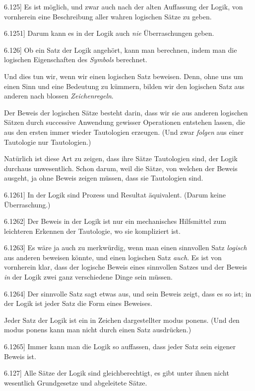 \documentclass[12pt,oneside]{book}[2007/10/19]
\newcommand{\PropERef}[1]{\hyperref[PropE:#1]{#1}}
\newcommand{\PropositionG}[2]{%
  \item[\phantomsection\label{PropG:#1}\PropERef{#1}] #2%
}
\newcommand{\Emph}[1]{\emph{#1}}%
\begin{document}
\begin{propositions}
\PropositionG{6.125}
{Es ist möglich, und zwar auch nach der alten
Auffassung der Logik, von vornherein eine Beschreibung
aller \glqq{}wahren\grqq{} logischen Sätze zu geben.}


\PropositionG{6.1251}
{Darum kann es in der Logik auch \Emph{nie} Überraschungen
geben.}


\PropositionG{6.126}
{Ob ein Satz der Logik angehört, kann man
berechnen, indem man die logischen Eigenschaften
des \Emph{Symbols} berechnet.

Und dies tun wir, wenn wir einen logischen
Satz \glqq{}beweisen\grqq{}. Denn, ohne uns um einen Sinn
und eine Bedeutung zu kümmern, bilden wir den
logischen Satz aus anderen nach blossen \Emph{Zeichenregeln}.

Der Beweis der logischen Sätze besteht darin,
dass wir sie aus anderen logischen Sätzen durch
successive Anwendung gewisser Operationen entstehen
lassen, die aus den ersten immer wieder
Tautologien erzeugen. (Und zwar \Emph{folgen} aus
einer Tautologie nur Tautologien.)

Natürlich ist diese Art zu zeigen, dass ihre
Sätze Tautologien sind, der Logik durchaus unwesentlich.
Schon darum, weil die Sätze, von
welchen der Beweis ausgeht, ja ohne Beweis zeigen
müssen, dass sie Tautologien sind.}


\PropositionG{6.1261}
{In der Logik sind Prozess und Resultat äquivalent.
(Darum keine Überraschung.)}


\PropositionG{6.1262}
{Der Beweis in der Logik ist nur ein mechanisches
Hilfsmittel zum leichteren Erkennen der
Tautologie, wo sie kompliziert ist.}


\PropositionG{6.1263}
{Es wäre ja auch zu merkwürdig, wenn man
einen sinnvollen Satz \Emph{logisch} aus anderen beweisen
könnte, und einen logischen Satz \Emph{auch}.
Es ist von vornherein klar, dass der logische
Beweis eines sinnvollen Satzes und der Beweis \Emph{in}
der Logik zwei ganz verschiedene Dinge sein
müssen.}


\PropositionG{6.1264}
{Der sinnvolle Satz sagt etwas aus, und sein
Beweis zeigt, dass es so ist; in der Logik ist jeder
Satz die Form eines Beweises.

Jeder Satz der Logik ist ein in Zeichen dargestellter
modus ponens. (Und den modus ponens
kann man nicht durch einen Satz ausdrücken.)}


\PropositionG{6.1265}
{Immer kann man die Logik so auffassen, dass
jeder Satz sein eigener Beweis ist.}


\PropositionG{6.127}
{Alle Sätze der Logik sind gleichberechtigt, es
gibt unter ihnen nicht wesentlich Grundgesetze
und abgeleitete Sätze.

}
\end{propositions}
\end{document}
